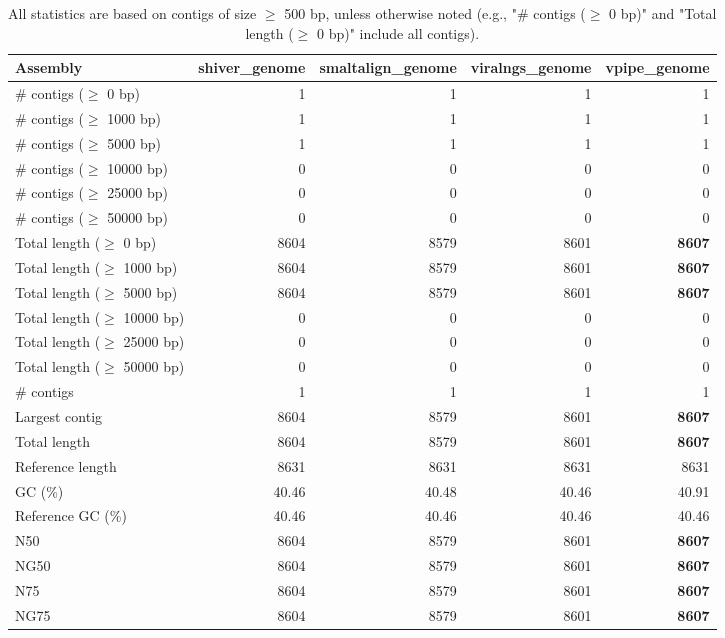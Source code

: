 \documentclass[12pt,a4paper]{article}
\begin{document}
\begin{table}[ht]
\begin{center}
\caption{All statistics are based on contigs of size $\geq$ 500 bp, unless otherwise noted (e.g., "\# contigs ($\geq$ 0 bp)" and "Total length ($\geq$ 0 bp)" include all contigs).}
\begin{tabular}{|l*{4}{|r}|}
\hline
Assembly & shiver\_genome & smaltalign\_genome & viralngs\_genome & vpipe\_genome \\ \hline
\# contigs ($\geq$ 0 bp) & 1 & 1 & 1 & 1 \\ \hline
\# contigs ($\geq$ 1000 bp) & 1 & 1 & 1 & 1 \\ \hline
\# contigs ($\geq$ 5000 bp) & 1 & 1 & 1 & 1 \\ \hline
\# contigs ($\geq$ 10000 bp) & 0 & 0 & 0 & 0 \\ \hline
\# contigs ($\geq$ 25000 bp) & 0 & 0 & 0 & 0 \\ \hline
\# contigs ($\geq$ 50000 bp) & 0 & 0 & 0 & 0 \\ \hline
Total length ($\geq$ 0 bp) & 8604 & 8579 & 8601 & {\bf 8607} \\ \hline
Total length ($\geq$ 1000 bp) & 8604 & 8579 & 8601 & {\bf 8607} \\ \hline
Total length ($\geq$ 5000 bp) & 8604 & 8579 & 8601 & {\bf 8607} \\ \hline
Total length ($\geq$ 10000 bp) & 0 & 0 & 0 & 0 \\ \hline
Total length ($\geq$ 25000 bp) & 0 & 0 & 0 & 0 \\ \hline
Total length ($\geq$ 50000 bp) & 0 & 0 & 0 & 0 \\ \hline
\# contigs & 1 & 1 & 1 & 1 \\ \hline
Largest contig & 8604 & 8579 & 8601 & {\bf 8607} \\ \hline
Total length & 8604 & 8579 & 8601 & {\bf 8607} \\ \hline
Reference length & 8631 & 8631 & 8631 & 8631 \\ \hline
GC (\%) & 40.46 & 40.48 & 40.46 & 40.91 \\ \hline
Reference GC (\%) & 40.46 & 40.46 & 40.46 & 40.46 \\ \hline
N50 & 8604 & 8579 & 8601 & {\bf 8607} \\ \hline
NG50 & 8604 & 8579 & 8601 & {\bf 8607} \\ \hline
N75 & 8604 & 8579 & 8601 & {\bf 8607} \\ \hline
NG75 & 8604 & 8579 & 8601 & {\bf 8607} \\ \hline

\end{tabular}
\end{center}
\end{table}
\end{document}

